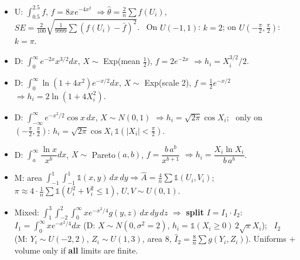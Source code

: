 \documentclass[10pt]{article}
\newcommand{\sub}[1]{\par\vspace{4pt}{\bfseries #1}\par\vspace{1pt}}
\newcommand{\one}{\mathbb{1}}
\begin{document}
\sub{Worked examples}
\begin{itemize}
\item U: $\int_{0.5}^{2.5}f$, $f=8xe^{-4x^2}$ $\Rightarrow \hat\theta=\frac2n\sum f(U_i)$, \ $SE=\frac{2}{100}\sqrt{\frac1{9999}\sum(f(U_i)-\bar f)^2}$. \ On $U(-1,1)$: $k=2$; on $U(-\frac\pi2,\frac\pi2)$: $k=\pi$.
\item D: $\int_0^\infty e^{-2x}x^{3/2}dx$, $X\sim$ Exp(mean $\tfrac12$), $f=2e^{-2x}$ $\Rightarrow h_i=X_i^{3/2}/2$.
\item D: $\int_0^\infty \ln(1+4x^2)e^{-x/2}dx$, $X\sim$ Exp(scale 2), $f=\tfrac12e^{-x/2}$ $\Rightarrow h_i=2\ln(1+4X_i^2)$.
\item D: $\int_{-\infty}^\infty e^{-x^2/2}\cos x\,dx$, $X\sim N(0,1)$ $\Rightarrow h_i=\sqrt{2\pi}\cos X_i$; \ only on $(-\frac\pi2,\frac\pi2)$: $h_i=\sqrt{2\pi}\cos X_i\,\one(|X_i|<\frac\pi2)$.
\item D: $\int_a^\infty \dfrac{\ln x}{x^b}dx$, $X\sim$ Pareto$(a,b)$, $f=\dfrac{b\,a^b}{x^{b+1}}$ $\Rightarrow h_i=\dfrac{X_i\ln X_i}{b\,a^b}$.
\item M: area $\int_{-1}^1\!\int_{-1}^1\one(x,y)\,dx\,dy \Rightarrow \hat A=\frac4n\sum\one(U_i,V_i)$; \ $\pi\approx 4\cdot\frac1n\sum\one(U_i^2+V_i^2\le1)$, $U,V\sim U(0,1)$.
\item Mixed: $\int_1^3\!\int_{-2}^2\!\int_0^\infty xe^{-x^2/4}g(y,z)\,dx\,dy\,dz$ $\Rightarrow$ \textbf{split} $I=I_1\cdot I_2$:
  $I_1=\int_0^\infty xe^{-x^2/4}dx$ (D: $X\sim N(0,\sigma^2=2)$, $h_i=\one(X_i\ge0)\,2\sqrt\pi X_i$); \
  $I_2$ (M: $Y_i\sim U(-2,2)$, $Z_i\sim U(1,3)$, area 8, $\hat I_2=\frac8n\sum g(Y_i,Z_i)$). Uniforms + volume only if \textbf{all} limits are finite.
\end{itemize}
\sub{Related questions}
\end{document}
